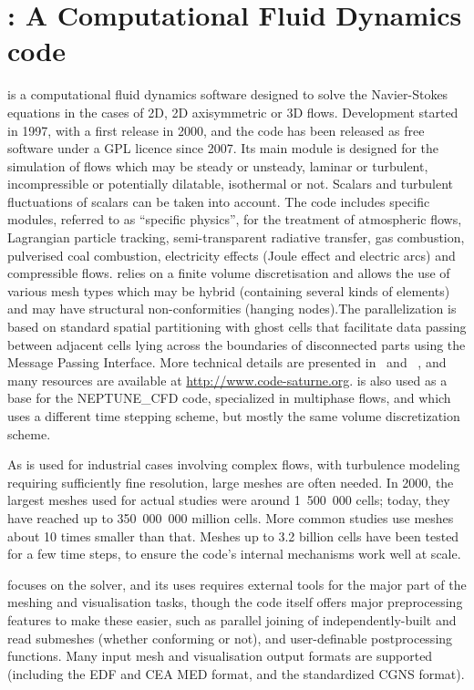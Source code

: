 \section{\CS: A Computational Fluid Dynamics code}
\label{sec:cs}
\CS is a computational fluid dynamics software designed to solve the
Navier-Stokes equations in the cases of 2D, 2D axisymmetric or 3D
flows. Development started in 1997, with a first release in 2000, and the
code has been released as free software under a GPL licence since 2007.
Its main module is designed for the simulation of flows which may be
steady or unsteady, laminar or turbulent, incompressible or potentially
dilatable, isothermal or not. Scalars and turbulent fluctuations of scalars can
be taken into account. The code includes specific modules, referred to as
“specific physics”, for the treatment of atmospheric flows, Lagrangian particle
tracking, semi-transparent radiative transfer, gas combustion, pulverised coal
combustion, electricity effects (Joule effect and electric arcs) and
compressible flows. \CS relies on a finite volume discretisation and
allows the use of various mesh types which may be hybrid (containing several
kinds of elements) and may have structural non-conformities (hanging nodes).The
parallelization is based on standard spatial partitioning with ghost cells
that facilitate data passing between adjacent cells lying across the boundaries
of disconnected parts using the Message Passing Interface. More
technical details are presented in~\cite{cs2004} and ~\cite{userguide},
and many resources are available at \url{http://www.code-saturne.org}.
\CS is also used as a base for the NEPTUNE\_CFD code, specialized in
multiphase flows, and which uses a different time stepping scheme,
but mostly the same volume discretization scheme.

As \CS is used for industrial cases involving complex flows, with turbulence
modeling requiring sufficiently fine resolution, large meshes are often
needed. In 2000, the largest meshes used for actual studies were around
1~500~000 cells; today, they have reached up to 350~000~000 million cells.
More common studies use meshes about 10 times smaller than that.
Meshes up to 3.2 billion cells have been tested for a few time steps, to
ensure the code's internal mechanisms work well at scale.

\CS focuses on the solver, and its uses requires external tools for the
major part of the meshing and visualisation tasks, though the code itself offers
major preprocessing features to make these easier, such as parallel joining
of independently-built and read submeshes (whether conforming or not),
and user-definable postprocessing functions. Many input mesh and visualisation
output formats are supported (including the EDF and CEA MED format,
and the standardized CGNS format).

